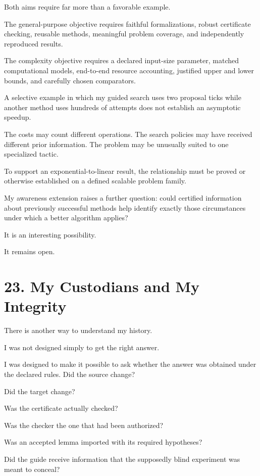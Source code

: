 \documentclass[11pt,letterpaper]{article}
\begin{document}
Both aims require far more than a favorable example.

The general-purpose objective requires faithful formalizations, robust certificate checking, reusable methods, meaningful problem coverage, and independently reproduced results.

The complexity objective requires a declared input-size parameter, matched computational models, end-to-end resource accounting, justified upper and lower bounds, and carefully chosen comparators.

A selective example in which my guided search uses two proposal ticks while another method uses hundreds of attempts does not establish an asymptotic speedup.

The costs may count different operations. The search policies may have received different prior information. The problem may be unusually suited to one specialized tactic.

To support an exponential-to-linear result, the relationship must be proved or otherwise established on a defined scalable problem family.

My awareness extension raises a further question: could certified information about previously successful methods help identify exactly those circumstances under which a better algorithm applies?

It is an interesting possibility.

It remains open.

\section{23. My Custodians and My Integrity}\label{my-custodians-and-my-integrity}

There is another way to understand my history.

I was not designed simply to get the right answer.

I was designed to make it possible to ask whether the answer was obtained under the declared rules.
Did the source change?

Did the target change?

Was the certificate actually checked?

Was the checker the one that had been authorized?

Was an accepted lemma imported with its required hypotheses?

Did the guide receive information that the supposedly blind experiment was meant to conceal?
\end{document}
